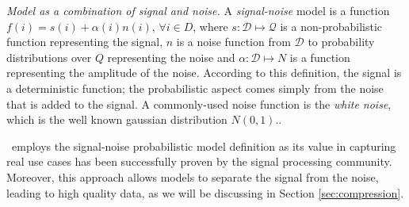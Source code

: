 \noindent \emph{Model as a combination of signal and noise.} A \emph{signal-noise} model is a function $f(i) = s(i) + \alpha(i) n(i)$, $\forall i \in D$, where $s: \mathcal{D} \mapsto \mathcal{Q}$ is a non-probabilistic function representing the signal, $n$ is a noise function from $\mathcal{D}$ to probability distributions over $Q$ representing the noise and $\alpha: \mathcal{D} \mapsto N$ is a function representing the amplitude of the noise. According to this definition, the signal is a deterministic function; the probabilistic aspect comes simply from the noise that is added to the signal. A  commonly-used noise function is the {\em white noise}, which is the well known gaussian distribution $N(0,1)$.\cite{statistical-signal-processing-textbook}.
 

\projName\ employs the signal-noise probabilistic model definition as its value in capturing real use cases has been successfully proven by the signal processing community. Moreover, this approach allows models to separate the signal from the noise, leading to high quality data, as we will be discussing in Section \ref{sec:compression}.



